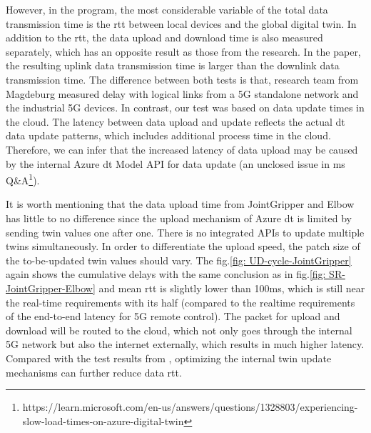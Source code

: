 However, in the program, the most considerable variable of 
the total data transmission time is the \gls{rtt} between local devices and the global digital 
twin. In addition to the \gls{rtt}, the data upload and download time is also measured 
separately, which has an opposite result as those from the research\cite{cainelli_performance_2023}. 
In the paper, the resulting uplink data transmission time is larger than the downlink 
data transmission time. The difference between both tests is that, research team from 
Magdeburg measured delay with logical links from a 5G standalone network and the industrial 
5G devices. In contrast, our test was based on data update times in the cloud. The latency 
between data upload and update reflects the actual \gls{dt} data update patterns, 
which includes additional process time in the cloud. Therefore, we can infer that the 
increased latency of data upload may be caused by the internal Azure \gls{dt} Model 
API for data update (an unclosed issue in \gls{ms} Q\&A\footnote[1]{https://learn.microsoft.com/en-us/answers/questions/1328803/experiencing-slow-load-times-on-azure-digital-twin}).
    

It is worth mentioning that the data upload time from JointGripper and Elbow has little to 
no difference since the upload mechanism of Azure \gls{dt} is limited by sending twin 
values one after one. There is no integrated APIs to update multiple twins simultaneously. 
In order to differentiate the upload speed, the patch size of the to-be-updated twin values 
should vary. The fig.\ref{fig: UD-cycle-JointGripper} again shows the cumulative delays 
with the same conclusion as in fig.\ref{fig: SR-JointGripper-Elbow} and mean \gls{rtt} is 
slightly lower than 100ms, which is still near the real-time requirements with its half 
(compared to the realtime requirements of the end-to-end latency for 5G remote control\cite{li_5g_2018}). 
The packet for 
upload and download will be routed to the cloud, which not only goes through the internal 
5G network but also the internet externally, which results in much higher latency. Compared 
with the test results from \cite{cainelli_performance_2023}, optimizing the internal twin 
update mechanisms can further reduce data \gls{rtt}. 



